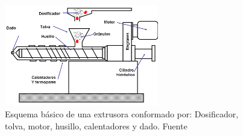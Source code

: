 \begin{figure}[H]
    \centering
    \includegraphics[width=0.6\textwidth]{images/extrusor.png}
    \caption[Esquema básico de una extrusora.]{Esquema básico de una extrusora conformado por: Dosificador, tolva, motor, husillo, calentadores y dado. Fuente \cite{disenoextrusor}}
    \label{fig:estado_extrusora}
\end{figure}

